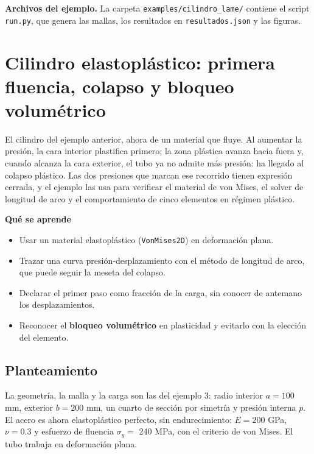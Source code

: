 \documentclass[11pt,oneside]{report}
\renewcommand{\chaptermark}[1]{\markboth{Cap.\ \thechapter\ ---\ #1}{}}
\begin{document}
\textbf{Archivos del ejemplo.} La carpeta \texttt{examples/\allowbreak{}cilindro\_\allowbreak{}lame/\allowbreak{}} contiene el script \texttt{run.py}, que genera las mallas, los resultados en \texttt{resultados.json} y las figuras.


\newpage

\chapter{Cilindro elastoplástico: primera fluencia, colapso y bloqueo volumétrico}
\chaptermark{Cilindro elastoplástico}
\label{cap:cilindro_elastoplastico}





El cilindro del ejemplo anterior, ahora de un material que fluye. Al aumentar la presión, la cara interior plastifica primero; la zona plástica avanza hacia fuera y, cuando alcanza la cara exterior, el tubo ya no admite más presión: ha llegado al colapso plástico. Las dos presiones que marcan ese recorrido tienen expresión cerrada, y el ejemplo las usa para verificar el material de von Mises, el solver de longitud de arco y el comportamiento de cinco elementos en régimen plástico.

\textbf{Qué se aprende}

\begin{itemize}
  \item Usar un material elastoplástico (\texttt{VonMises2D}) en deformación plana.
  \item Trazar una curva presión-desplazamiento con el método de longitud de arco, que puede seguir la meseta del colapso.
  \item Declarar el primer paso como fracción de la carga, sin conocer de antemano los desplazamientos.
  \item Reconocer el \textbf{bloqueo volumétrico} en plasticidad y evitarlo con la elección del elemento.
\end{itemize}

\section{Planteamiento}

La geometría, la malla y la carga son las del ejemplo 3: radio interior $a = 100$ mm, exterior $b = 200$ mm, un cuarto de sección por simetría y presión interna $p$. El acero es ahora elastoplástico perfecto, sin endurecimiento: $E = 200$ GPa, $\nu = 0.3$ y esfuerzo de fluencia $\sigma_y =$ 240 MPa, con el criterio de von Mises. El tubo trabaja en deformación plana.
\end{document}
